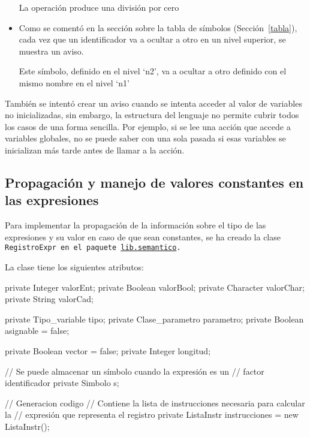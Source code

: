 \begin{itemize}
    \begin{codigo}
    La operación produce una división por cero
    \end{codigo}

    \item Como se comentó en la sección sobre la tabla de símbolos (Sección~\ref{tabla}), cada vez que un identificador va a ocultar a otro en un nivel superior, se muestra un aviso.

    \begin{codigo}
    Este símbolo, definido en el nivel `n2', va a ocultar a otro definido con el mismo nombre en el nivel `n1'
    \end{codigo}

\end{itemize}

También se intentó crear un aviso cuando se intenta acceder al valor de variables no inicializadas, sin embargo, la estructura del lenguaje no permite cubrir todos los casos de una forma sencilla. Por ejemplo, si se lee una acción que accede a variables globales, no se puede saber con una sola pasada si esas variables se inicializan más tarde antes de llamar a la acción.

\subsection{Propagación y manejo de valores constantes en las expresiones}
Para implementar la propagación de la información sobre el tipo de las expresiones y su valor en caso de que sean constantes, se ha creado la clase \tt{RegistroExpr} en el paquete \url{lib.semantico}.

La clase tiene los siguientes atributos:

\begin{codigo}[style=java]
private Integer valorEnt;
private Boolean valorBool;
private Character valorChar;
private String valorCad;

private Tipo_variable tipo;
private Clase_parametro parametro;
private Boolean asignable = false;

private Boolean vector = false;
private Integer longitud;

// Se puede almacenar un símbolo cuando la expresión es un
// factor identificador
private Simbolo s;

// Generacion codigo
// Contiene la lista de instrucciones necesaria para calcular la
// expresión que representa el registro
private ListaInstr instrucciones = new ListaInstr();
\end{codigo}


